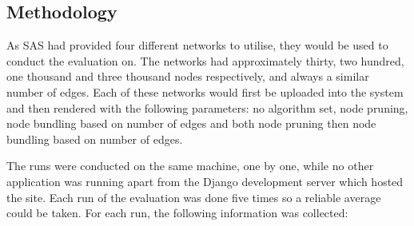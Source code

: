 \documentclass[../dissertation.tex]{subfiles}
\begin{document}
\subsection{Methodology}

As SAS had provided four different networks to utilise, they would be used to conduct the evaluation on. The networks had approximately thirty, two hundred, one thousand and three thousand nodes respectively, and always a similar number of edges. Each of these networks would first be uploaded into the system and then rendered with the following parameters: no algorithm set, node pruning, node bundling based on number of edges and both node pruning then node bundling based on number of edges.

The runs were conducted on the same machine, one by one, while no other application was running apart from the Django development server which hosted the site. Each run of the evaluation was done five times so a reliable average could be taken. For each run, the following information was collected:
\end{document}
